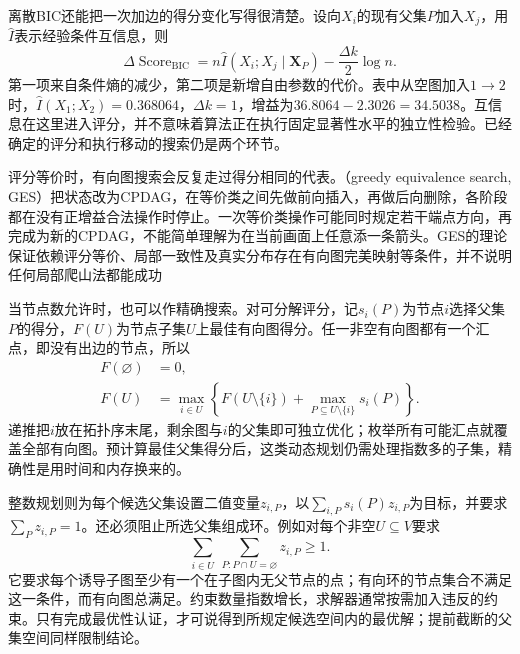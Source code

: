 离散BIC还能把一次加边的得分变化写得很清楚。设向$X_i$的现有父集$P$加入$X_j$，用$\widehat I$表示经验条件互信息，则
\begin{equation}
  \Delta\operatorname{Score}_{\mathrm{BIC}}
  =n\widehat I(X_i;X_j\mid\bm{X}_P)
   -\frac{\Delta k}{2}\log n.
  \label{eq:pgm-structure-learning-score-gain}
\end{equation}
第一项来自条件熵的减少，第二项是新增自由参数的代价。表中从空图加入$1\to2$时，$\widehat I(X_1;X_2)=0.368064$，$\Delta k=1$，增益为$36.8064-2.3026=34.5038$。互信息在这里进入评分，并不意味着算法正在执行固定显著性水平的独立性检验。已经确定的评分和执行移动的搜索仍是两个环节。

评分等价时，有向图搜索会反复走过得分相同的代表。（greedy equivalence search, GES）把状态改为CPDAG，在等价类之间先做前向插入，再做后向删除，各阶段都在没有正增益合法操作时停止。一次等价类操作可能同时规定若干端点方向，再完成为新的CPDAG，不能简单理解为在当前画面上任意添一条箭头。GES的理论保证依赖评分等价、局部一致性及真实分布存在有向图完美映射等条件，并不说明任何局部爬山法都能成功

当节点数允许时，也可以作精确搜索。对可分解评分，记$s_i(P)$为节点$i$选择父集$P$的得分，$F(U)$为节点子集$U$上最佳有向图得分。任一非空有向图都有一个汇点，即没有出边的节点，所以
\begin{equation}
  \begin{aligned}
    F(\varnothing)&=0,\\
    F(U)&=\max_{i\in U}\left\{
      F(U\setminus\{i\})
      +\max_{P\subseteq U\setminus\{i\}}s_i(P)\right\}.
  \end{aligned}
  \label{eq:pgm-structure-learning-dp}
\end{equation}
递推把$i$放在拓扑序末尾，剩余图与$i$的父集即可独立优化；枚举所有可能汇点就覆盖全部有向图。预计算最佳父集得分后，这类动态规划仍需处理指数多的子集，精确性是用时间和内存换来的。

整数规划则为每个候选父集设置二值变量$z_{i,P}$，以$\sum_{i,P}s_i(P)z_{i,P}$为目标，并要求$\sum_Pz_{i,P}=1$。还必须阻止所选父集组成环。例如对每个非空$U\subseteq V$要求
\[
  \sum_{i\in U}\ \sum_{P:P\cap U=\varnothing}z_{i,P}\geq1.
\]
它要求每个诱导子图至少有一个在子图内无父节点的点；有向环的节点集合不满足这一条件，而有向图总满足。约束数量指数增长，求解器通常按需加入违反的约束。只有完成最优性认证，才可说得到所规定候选空间内的最优解；提前截断的父集空间同样限制结论。

